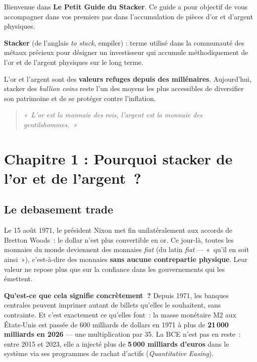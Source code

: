 \documentclass[14pt,a4paper]{extarticle}
\begin{document}
Bienvenue dans \textbf{Le Petit Guide du Stacker}. Ce guide a pour objectif de vous accompagner dans vos premiers pas dans l'accumulation de pièces d'or et d'argent physiques.

\textbf{Stacker} (de l'anglais \textit{to stack}, empiler) : terme utilisé dans la communauté des métaux précieux pour désigner un investisseur qui accumule méthodiquement de l'or et de l'argent physiques sur le long terme.

L'or et l'argent sont des \textbf{valeurs refuges depuis des millénaires}. Aujourd'hui, stacker des \textit{bullion coins} reste l'un des moyens les plus accessibles de diversifier son patrimoine et de se protéger contre l'inflation.

\begin{quote}
\textit{«~L'or est la monnaie des rois, l'argent est la monnaie des gentilshommes.~»}
\end{quote}

\newpage

\section{Chapitre 1 : Pourquoi stacker de l'or et de l'argent~?}

\subsection{Le debasement trade}

Le 15 août 1971, le président Nixon met fin unilatéralement aux accords de Bretton Woods~: le dollar n'est plus convertible en or. Ce jour-là, toutes les monnaies du monde deviennent des monnaies \textit{fiat} (du latin \textit{fiat} --- «~qu'il en soit ainsi~»), c'est-à-dire des monnaies \textbf{sans aucune contrepartie physique}. Leur valeur ne repose plus que sur la confiance dans les gouvernements qui les émettent.

\textbf{Qu'est-ce que cela signifie concrètement~?} Depuis 1971, les banques centrales peuvent imprimer autant de billets qu'elles le souhaitent, sans contrainte. Et c'est exactement ce qu'elles font~: la masse monétaire M2 aux États-Unis est passée de 600 milliards de dollars en 1971 à plus de \textbf{21\,000 milliards en 2026} --- une multiplication par 35. La BCE n'est pas en reste~: entre 2015 et 2023, elle a injecté plus de \textbf{5\,000 milliards d'euros} dans le système via ses programmes de rachat d'actifs (\textit{Quantitative Easing}).
\end{document}
